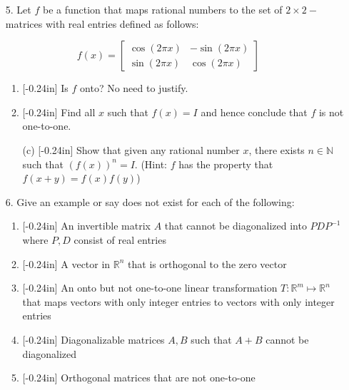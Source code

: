 \documentclass[letterpaper,12pt]{article}
\theoremstyle{definition}
\begin{document}
\newpage
\begin{enumerate}
    \item[5.] Let $f$ be a function that maps rational numbers to the set of $2\times2-$matrices with real entries defined as follows:
\end{enumerate}
$$f(x) = \begin{bmatrix}
    \cos(2\pi x) & -\sin(2\pi x) \\ \sin(2\pi x) & \cos(2\pi x)
\end{bmatrix}$$
\begin{enumerate}
    \item[] \begin{enumerate}
        \item\reversemarginpar{}[-0.24in] Is $f$ onto? No need to justify.
        \vspace{1in}
        \item\reversemarginpar{}[-0.24in] Find all $x$ such that $f(x) = I$ and hence conclude that $f$ is not one-to-one.
    \end{enumerate}
\end{enumerate}
\newpage
\begin{enumerate}
    \item[] \begin{enumerate}
        \item[(c)]\reversemarginpar{}[-0.24in] Show that given any rational number $x$, there exists $n \in \mathbb{N}$ such that $(f(x))^n = I$. (Hint: $f$ has the property that $f(x+y) = f(x)f(y)$)
    \end{enumerate}
\end{enumerate}
\newpage
\begin{enumerate}
    \item[6.]  Give an example or say does not exist for each of the following: \begin{enumerate}
        \item\reversemarginpar{}[-0.24in] An invertible matrix $A$ that cannot be diagonalized into $PDP^{-1}$ where $P,D$ consist of real entries
        \vspace{1.4in}
        \item\reversemarginpar{}[-0.24in] A vector in $\mathbb{R}^n$ that is orthogonal to the zero vector
        \vspace{1.4in}
        \item\reversemarginpar{}[-0.24in] An onto but not one-to-one linear transformation $T: \mathbb{R}^m \mapsto \mathbb{R}^n$ that maps vectors with only integer entries to vectors with only integer entries
        \vspace{1.4in}
        \item\reversemarginpar{}[-0.24in] Diagonalizable matrices $A,B$ such that $A+B$ cannot be diagonalized
        \vspace{1.4in}
        \item\reversemarginpar{}[-0.24in] Orthogonal matrices that are not one-to-one
    \end{enumerate}
\end{enumerate}
\end{document}
